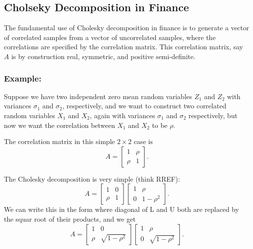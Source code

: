 \documentclass{amsart}
\theoremstyle{plain}
\numberwithin{equation}{section}
\begin{document}
\subsection{Cholseky Decomposition in Finance}
The fundamental use of Cholesky decomposition 
in finance is to generate a vector of correlated
samples from a vector of uncorrelated samples, where
the correlations are specified by the correlation 
matrix. This correlation matrix, say $A$ is by 
construction real, symmetric, and positive semi-definite.

\subsubsection{Example:}
Suppose we have two independent zero mean random variables 
$Z_1$ and $Z_2$ with variances $\sigma_1$ and $\sigma_2$, 
respectively, and we want to construct two correlated random variables
$X_1$ and $X_2$, again with variances $\sigma_1$ and $\sigma_2$ respectively,
but now we want the correlation between $X_1$ and $X_2$ to be $\rho$. 

The correlation matrix in this simple $2 \times 2$ case is
\begin{equation}
A = \left[
\begin{array}{cc}
	1    & \rho\\
	\rho & 1
\end{array}
\right].
\label{}
\end{equation}

The Cholesky decomposition is very simple (think RREF):
\begin{equation}
A = \left[
\begin{array}{cc}
	1    & 0\\
	\rho & 1
\end{array}
\right]
\left[
\begin{array}{cc}
	1  & \rho\\
	0  & 1 - \rho^2
\end{array}
\right].
\label{}
\end{equation}
We can write this in the form where 
diagonal of L and U both are 
replaced by the squar root of their
products, and we get
\begin{equation}
A = \left[
\begin{array}{cc}
	1    & 0\\
	\rho & \sqrt{1-\rho^2}
\end{array}
\right]
\left[
\begin{array}{cc}
	1  & \rho\\
	0  & \sqrt{1 - \rho^2}
\end{array}
\right].
\label{}
\end{equation}
\end{document}
